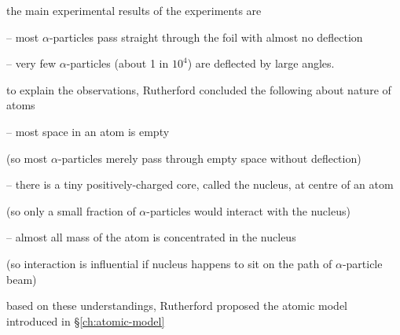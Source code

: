 \cmt the main experimental results of the experiments are

\begin{compactitem}
	\item[--] most $\alpha$-particles pass straight through the foil with almost no deflection
	
	\item[--] very few $\alpha$-particles (about 1 in $10^4$) are deflected by large angles.
\end{compactitem}

\cmt to explain the observations, Rutherford concluded the following about nature of atoms

\begin{compactitem}
	\item[--] most space in an atom is empty
	
	(so most $\alpha$-particles merely pass through empty space without deflection)
	
	\item[--] there is a tiny positively-charged core, called the nucleus, at centre of an atom
	
	(so only a small fraction of $\alpha$-particles would interact with the nucleus)
	
	\item[--] almost all mass of the atom is concentrated in the nucleus
	
	(so interaction is influential if nucleus happens to sit on the path of $\alpha$-particle beam)
\end{compactitem}

based on these understandings, Rutherford proposed the atomic model introduced in \S\ref{ch:atomic-model}

